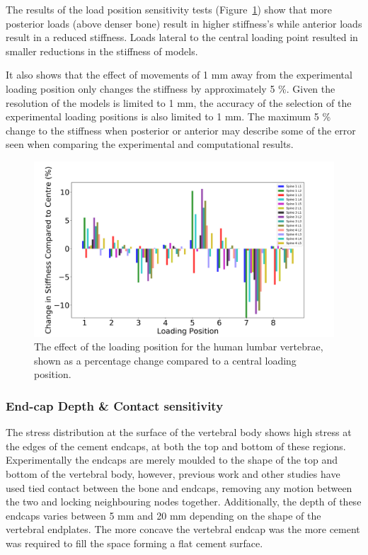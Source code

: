 The results of the load position sensitivity tests (Figure~\ref{fig:hum_load}) show that more posterior loads (above denser bone) result in higher stiffness's while anterior loads result in a reduced stiffness. Loads lateral to the central loading point resulted in smaller reductions in the stiffness of models.

It also shows that the effect of movements of 1 mm away from the experimental loading position only changes the stiffness by approximately 5 \%.
Given the resolution of the models is limited to 1 mm, the accuracy of the selection of the experimental loading positions is also limited to 1 mm.
The maximum 5 \% change to the stiffness when posterior or anterior may describe some of the error seen when comparing the experimental and computational results.

\begin{figure}[ht!]
\centering
\includegraphics[width=\textwidth]{Chapters/Chapter_HT_images/human_fossil_loading.png}
\caption{The effect of the loading position for the human lumbar vertebrae, shown as a percentage change compared to a central loading position.}
\label{fig:hum_load}
\end{figure}



\subsubsection{End-cap Depth \& Contact sensitivity}

The stress distribution at the surface of the vertebral body shows high stress at the edges of the cement endcaps, at both the top and bottom of these regions.
Experimentally the endcaps are merely moulded to the shape of the top and bottom of the vertebral body, however, previous work and other studies have used tied contact between the bone and endcaps, removing any motion between the two and locking neighbouring nodes together.
Additionally, the depth of these endcaps varies between 5 mm and 20 mm depending on the shape of the vertebral endplates.
The more concave the vertebral endcap was the more cement was required to fill the space forming a flat cement surface.

